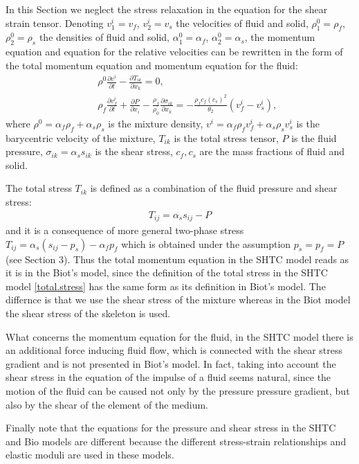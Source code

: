\documentclass[3p,times]{elsarticle}
\begin{document}
In this Section we neglect the stress relaxation in the equation for the shear strain tensor.
Denoting $v^i_1=v_f$, $v^i_2=v_s$ the velocities of fluid and solid, $\rho^0_1=\rho_f$, $\rho^0_2=\rho_s$ the densities of fluid and solid, $\alpha^0_1=\alpha_f$, $\alpha^0_2=\alpha_s$, the momentum equation and equation for the relative velocities can be rewritten in the form of the total momentum equation and momentum equation for the fluid:
\begin{eqnarray}
&& \rho^0 \frac{\partial v^i}{\partial t}-\frac{\partial T_{ik}}{\partial x_k} = 0, \nonumber \\
&& \rho_f\frac{\partial v^i_f}{\partial t}+ \frac{\partial P}{\partial x_i}-\frac{\rho_f}{\rho_0}
\frac{\partial \sigma_{ik}}{\partial x_k}=
-\frac{\rho_fc_f(c_s)^2}{\theta_2}(v_f^i-v_s^i),  \nonumber
\end{eqnarray}
where $\rho^0=\alpha_f\rho_f+\alpha_s\rho_s$ is the mixture density, $v^i=\alpha_f\rho_f v^i_f+
\alpha_s\rho_s v^i_s$ is the barycentric velocity of the mixture, $T_{ik}$ is the total stress tensor, $P$ is the fluid pressure, $\sigma_{ik}=\alpha_s s_{ik}$ is the shear stress, $c_f,c_s$ are the mass fractions of fluid and solid. 

The total stress $T_{ik}$ is defined as a combination of the fluid pressure and shear stress:
\begin{align} \label{total.stress}
T_{ij} =\alpha_s s_{ij}-P
\end{align}
and it is a consequence of more general two-phase stress 
$T_{ij}=\alpha_s (s_{ij}- p_s)-\alpha_f p_f$ which is obtained under the assumption $p_s=p_f=P$ (see Section 3). Thus the total momentum equation in the SHTC model reads as it is in the Biot's model, since the definition of the total stress in the SHTC model \eqref{total.stress} has the same form as its definition in Biot's model. The differnce is that we use the shear stress of the mixture whereas in the Biot model the shear stress of the skeleton is used. 

What concerns the momentum equation for the fluid, in the SHTC model there is an additional force inducing fluid flow, which is connected with the shear stress gradient and is not presented in Biot's model.  In fact, taking into account the shear stress in the equation of the impulse of a fluid seems natural, since the motion of the fluid can be caused not only by the pressure pressure gradient, but also by the shear of the element of the medium.

Finally note that the equations for the pressure and shear stress in the SHTC and Bio models are different because the different stress-strain relationships and elastic moduli are used in these models.  
\end{document}
